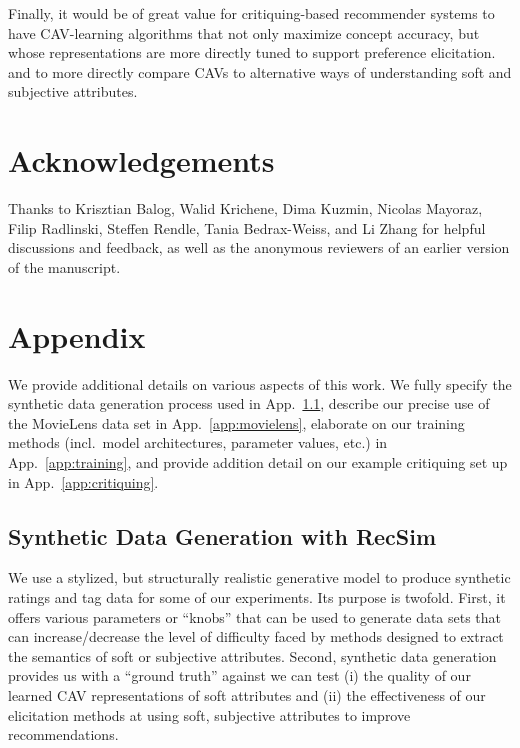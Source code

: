 \documentclass[manuscript,screen,nonacm]{acmart}
\newcommand{\1}{{\mathbf 1}}
\theoremstyle{TheoremNum}
\begin{document}
Finally, it would be of great value for critiquing-based recommender systems to have
CAV-learning algorithms that not only maximize concept accuracy, but whose representations are more directly tuned to support preference elicitation.
and to more directly compare CAVs to alternative ways of understanding soft and subjective attributes.


\section*{Acknowledgements}

Thanks to Krisztian Balog, Walid Krichene, Dima Kuzmin, Nicolas Mayoraz, Filip Radlinski, Steffen Rendle, Tania Bedrax-Weiss, and Li Zhang for helpful discussions and feedback, as well as the anonymous reviewers of an earlier version of the manuscript.





\appendix

\section{Appendix}

We provide additional details on various aspects of this work.
We fully specify the synthetic data generation process used in App.~\ref{app:syntheticdata}, describe our precise use of the MovieLens data set in 
App.~\ref{app:movielens},  elaborate on our training methods (incl.\ model architectures, parameter values, etc.) in App.~\ref{app:training}, and provide addition detail on our example critiquing set up in App.~\ref{app:critiquing}.


\subsection{Synthetic Data Generation with RecSim}
\label{app:syntheticdata}

We use a stylized, but structurally realistic generative model to produce synthetic ratings and tag data for some of our experiments. Its purpose is twofold. First, it offers various parameters or ``knobs'' that can be used to generate data sets that can increase/decrease the level of difficulty faced by methods designed to extract the semantics of soft or subjective attributes. Second, synthetic data generation provides us with a ``ground truth'' against we can test (i) the quality of our learned CAV representations of soft attributes and (ii) the effectiveness of our elicitation methods at using soft, subjective attributes to improve recommendations.
\end{document}
